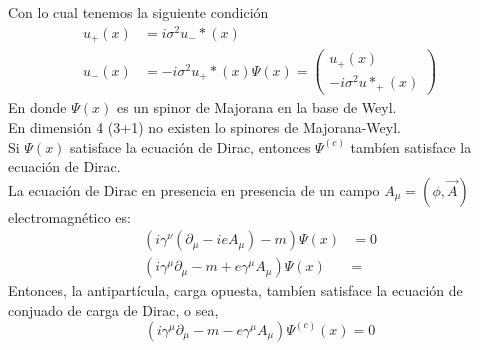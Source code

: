\documentclass[../main.tex]{subfiles}
\begin{document}
Con lo cual tenemos la siguiente condición
\begin{align*}
  u_+(x) & = i\sigma^2u_-*(x) \\
  u_-(x) & = -i\sigma^2 u_+*(x)
  \Psi(x) = \begin{pmatrix}
    u_+(x) \\ -i\sigma^2 u*_+(x)
  \end{pmatrix}
\end{align*}
En donde $\Psi(x)$ es un spinor de Majorana en la base de Weyl. \\
En dimensión 4 (3+1) no existen lo spinores de Majorana-Weyl. \\
Si $\Psi(x)$ satisface la ecuación de Dirac, entonces $\Psi^{(c)}$ tambíen satisface la ecuación de Dirac. \\
La ecuación de Dirac en presencia en presencia de un campo $A_\mu=(\phi,\vec{A})$ electromagnético es:
\begin{align}
  \left( i\gamma^\nu \left( \partial_\mu - ieA_\mu \right) - m \right)\Psi(x) & = 0 \\
  \left( i\gamma^\mu \partial_\mu - m +e\gamma^\mu A_\mu \right)\Psi(x) & =
\end{align}
Entonces, la antipartícula, carga opuesta, tambíen satisface la ecuación de conjuado de carga de Dirac, o sea,
\begin{equation}
  \left( i\gamma^\mu \partial_\mu - m -e\gamma^\mu A_\mu   \right)\Psi^{(c)}(x) = 0
 \end{equation}
\end{document}
